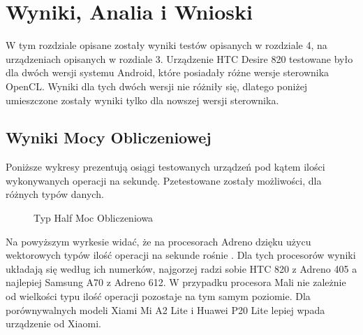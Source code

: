 \section[Wyniki, Analia i Wnioski]{Wyniki, Analia i Wnioski}
W tym rozdziale opisane zostały wyniki testów opisanych w rozdziale 4, na urządzeniach opisanych w rozdiale 3. Urządzenie HTC Desire 820 testowane było dla dwóch wersji systemu Android, które posiadały różne wersje sterownika OpenCL. Wyniki dla tych dwóch wersji nie różniły się, dlatego poniżej umieszczone zostały wyniki tylko dla nowszej wersji sterownika.
\subsection[Wyniki Mocy Obliczeniowej]{Wyniki Mocy Obliczeniowej}
Poniższe wykresy prezentują osiągi testowanych urządzeń pod kątem ilości wykonywanych operacji na sekundę. Pzetestowane zostały możliwości, dla różnych typów danych.
\begin{figure}[H]
\caption{Typ Half Moc Obliczeniowa}
\end{figure}
Na powyższym wyrkesie widać, że na procesorach Adreno dzięku użycu wektorowych typów ilość operacji na sekunde rośnie . Dla tych procesorów wyniki układają się według ich numerków, najgorzej radzi sobie HTC 820 z Adreno 405 a najlepiej Samsung A70 z Adreno 612. W przypadku procesora Mali nie zależnie od wielkości typu ilość operacji pozostaje na tym samym poziomie. Dla porównywalnych modeli Xiami Mi A2 Lite i Huawei P20 Lite lepiej wpada urządzenie od Xiaomi.

